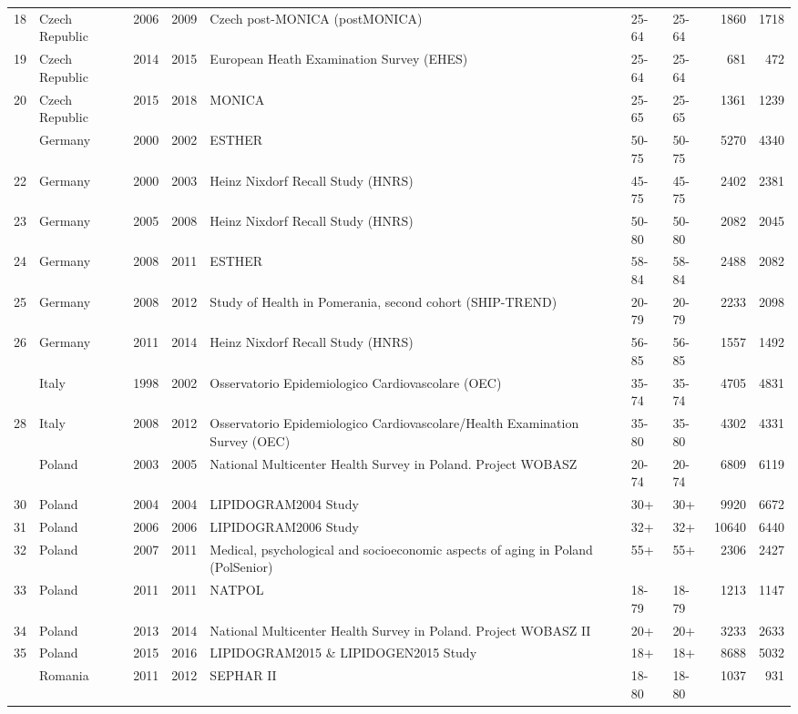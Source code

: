 \begin{longtable}[t]{rlrrlllrr}
18 & Czech Republic & 2006 & 2009 & Czech post-MONICA (postMONICA) & 25-64 & 25-64 & 1860 & 1718\\
19 & Czech Republic & 2014 & 2015 & European Heath Examination Survey (EHES) & 25-64 & 25-64 & 681 & 472\\
20 & Czech Republic & 2015 & 2018 & MONICA & 25-65 & 25-65 & 1361 & 1239\\
\addlinespace
21 & Germany & 2000 & 2002 & ESTHER & 50-75 & 50-75 & 5270 & 4340\\
22 & Germany & 2000 & 2003 & Heinz Nixdorf Recall Study (HNRS) & 45-75 & 45-75 & 2402 & 2381\\
23 & Germany & 2005 & 2008 & Heinz Nixdorf Recall Study (HNRS) & 50-80 & 50-80 & 2082 & 2045\\
24 & Germany & 2008 & 2011 & ESTHER & 58-84 & 58-84 & 2488 & 2082\\
25 & Germany & 2008 & 2012 & Study of Health in Pomerania, second cohort (SHIP-TREND) & 20-79 & 20-79 & 2233 & 2098\\
26 & Germany & 2011 & 2014 & Heinz Nixdorf Recall Study (HNRS) & 56-85 & 56-85 & 1557 & 1492\\
\addlinespace
27 & Italy & 1998 & 2002 & Osservatorio Epidemiologico Cardiovascolare (OEC) & 35-74 & 35-74 & 4705 & 4831\\
28 & Italy & 2008 & 2012 & Osservatorio Epidemiologico Cardiovascolare/Health Examination Survey (OEC) & 35-80 & 35-80 & 4302 & 4331\\
\addlinespace
29 & Poland & 2003 & 2005 & National Multicenter Health Survey in Poland. Project WOBASZ & 20-74 & 20-74 & 6809 & 6119\\
30 & Poland & 2004 & 2004 & LIPIDOGRAM2004 Study & 30+ & 30+ & 9920 & 6672\\
31 & Poland & 2006 & 2006 & LIPIDOGRAM2006 Study & 32+ & 32+ & 10640 & 6440\\
32 & Poland & 2007 & 2011 & Medical, psychological and socioeconomic aspects of aging in Poland (PolSenior) & 55+ & 55+ & 2306 & 2427\\
33 & Poland & 2011 & 2011 & NATPOL & 18-79 & 18-79 & 1213 & 1147\\
34 & Poland & 2013 & 2014 & National Multicenter Health Survey in Poland. Project WOBASZ II & 20+ & 20+ & 3233 & 2633\\
35 & Poland & 2015 & 2016 & LIPIDOGRAM2015 \& LIPIDOGEN2015 Study & 18+ & 18+ & 8688 & 5032\\
\addlinespace
36 & Romania & 2011 & 2012 & SEPHAR II & 18-80 & 18-80 & 1037 & 931\\

\end{longtable}
